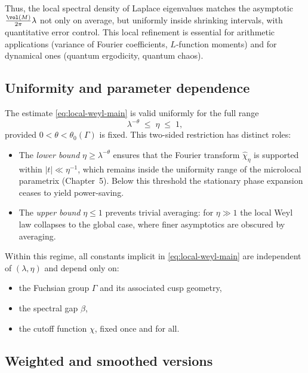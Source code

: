 Thus, the local spectral density of Laplace eigenvalues matches the asymptotic $\tfrac{\vol(M)}{2\pi}\lambda$ not only on average, but uniformly inside shrinking intervals, with quantitative error control. This local refinement is essential for arithmetic applications (variance of Fourier coefficients, $L$-function moments) and for dynamical ones (quantum ergodicity, quantum chaos).


\subsection{Uniformity and parameter dependence}

The estimate \eqref{eq:local-weyl-main} is valid uniformly for the full range
\[
\lambda^{-\theta} \;\le\; \eta \;\le\; 1,
\]
provided $0<\theta<\theta_0(\Gamma)$ is fixed. This two-sided restriction has distinct roles:

\begin{itemize}
  \item The \emph{lower bound} $\eta \ge \lambda^{-\theta}$ ensures that the Fourier transform $\widehat{\chi}_\eta$ is supported within $|t|\ll \eta^{-1}$, which remains inside the uniformity range of the microlocal parametrix (Chapter~5). Below this threshold the stationary phase expansion ceases to yield power-saving.
  \item The \emph{upper bound} $\eta \le 1$ prevents trivial averaging: for $\eta\gg 1$ the local Weyl law collapses to the global case, where finer asymptotics are obscured by averaging.
\end{itemize}

Within this regime, all constants implicit in \eqref{eq:local-weyl-main} are independent of $(\lambda,\eta)$ and depend only on:
\begin{itemize}
  \item the Fuchsian group $\Gamma$ and its associated cusp geometry,
  \item the spectral gap $\beta$,
  \item the cutoff function $\chi$, fixed once and for all.
\end{itemize}

\subsection{Weighted and smoothed versions}

